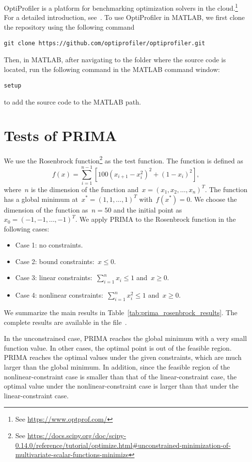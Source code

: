 \documentclass[12pt,a4paper]{article}  %
\newcounter{cite}
\theoremstyle{definition}
\numberwithin{equation}{section}
\begin{document}
OptiProfiler is a platform for benchmarking optimization solvers in the cloud.\footnote{See \url{https://www.optprof.com/}} For a detailed introduction, see~\cite{key}.
To use OptiProfiler in MATLAB, we first clone the repository using the following command
\begin{verbatim}
git clone https://github.com/optiprofiler/optiprofiler.git
\end{verbatim}
Then, in MATLAB, after navigating to the folder where the source code is located, run the following command in the MATLAB command window:
\begin{verbatim}
setup
\end{verbatim}
to add the source code to the MATLAB path. 




\section{Tests of PRIMA}

We use the Rosenbrock function\footnote{See \url{https://docs.scipy.org/doc/scipy-0.14.0/reference/tutorial/optimize.html\#unconstrained-minimization-of-multivariate-scalar-functions-minimize}} as the test function. The function is defined as 
\begin{equation}
    f(x) = \sum_{i=1}^{n-1} \left[ 100(x_{i+1} - x_i^2)^2 + (1 - x_i)^2 \right],
\end{equation}
where~$n$ is the dimension of the function and~$x = (x_1, x_2, \ldots, x_n)^T$. The function has a global minimum at~$x^* = (1, 1, \ldots, 1)^T$ with~$f(x^*) = 0$. We choose the dimension of the function as~$n = 50$ and the initial point as~$x_0 = (-1, -1, \ldots, -1)^T$. We apply PRIMA to the Rosenbrock function in the following cases:
\begin{itemize}
    \item Case 1: no constraints.
    \item Case 2: bound constraints:~$x \leq 0$.
    \item Case 3: linear constraints:~$\sum_{i=1}^n  x_i \leq 1$ and~$x \geq 0$.
    \item Case 4: nonlinear constraints:~$\sum_{i=1}^n  x_i^2 \leq 1$ and~$x \geq 0$.
\end{itemize}
We summarize the main results in Table~\ref{tab:prima_rosenbrock_results}. The complete results are available in the file~. 

In the unconstrained case, PRIMA reaches the global minimum with a very small function value. In other cases, the optimal point is out of the feasible region. PRIMA reaches the optimal values under the given constraints, which are much larger than the global minimum. In addition, since the feasible region of the nonlinear-constraint case is smaller than that of the linear-constraint case, the optimal value under the nonlinear-constraint case is larger than that under the linear-constraint case.
\end{document}

